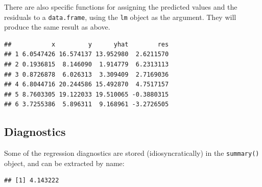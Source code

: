\documentclass[]{book}
\newenvironment{Shaded}{\begin{snugshade}}{\end{snugshade}}
\newcommand{\KeywordTok}[1]{\textcolor[rgb]{0.13,0.29,0.53}{\textbf{#1}}}
\newcommand{\CommentTok}[1]{\textcolor[rgb]{0.56,0.35,0.01}{\textit{#1}}}
\newcommand{\OperatorTok}[1]{\textcolor[rgb]{0.81,0.36,0.00}{\textbf{#1}}}
\newcommand{\NormalTok}[1]{#1}
\theoremstyle{definition}
\theoremstyle{definition}
\theoremstyle{definition}
\theoremstyle{remark}
\begin{document}
There are also specific functions for assigning the predicted values and
the residuals to a \texttt{data.frame}, using the \texttt{lm} object as
the argument. They will produce the same result as above.

\begin{Shaded}
\end{Shaded}

\begin{verbatim}
##           x         y      yhat        res
## 1 6.0547426 16.574137 13.952980  2.6211570
## 2 0.1936815  8.146090  1.914779  6.2313113
## 3 0.8726878  6.026313  3.309409  2.7169036
## 4 6.8044716 20.244586 15.492870  4.7517157
## 5 8.7603305 19.122033 19.510065 -0.3880315
## 6 3.7255386  5.896311  9.168961 -3.2726505
\end{verbatim}

\subsection{Diagnostics}\label{diagnostics}

Some of the regression diagnostics are stored (idiosyncratically) in the
\texttt{summary()} object, and can be extracted by name:

\begin{Shaded}
\end{Shaded}

\begin{verbatim}
## [1] 4.143222
\end{verbatim}

\begin{Shaded}
\end{Shaded}
\end{document}
